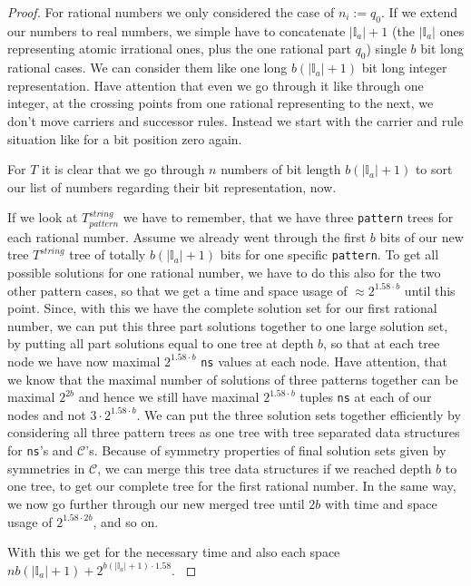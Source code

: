 \begin{proof}
    For rational numbers we only considered the case of $n_{i} := q_{0}$. If we extend our numbers to real numbers, we simple have to concatenate $|\mathbb{I}_{a}| + 1$ (the $|\mathbb{I}_{a}|$ ones representing atomic irrational ones, plus the one rational part $q_{0}$) single $b$ bit long rational cases. We can consider them like one long $b\left(|\mathbb{I}_{a}| + 1\right)$ bit long integer representation. Have attention that even we go through it like through one integer, at the crossing points from one rational representing to the next, we don't move carriers and successor rules. Instead we start with  the carrier and rule situation like for a bit position zero again.

For $T$ it is clear that we go through $n$ numbers of bit length $b\left(|\mathbb{I}_{a}| + 1\right)$ to sort our list of numbers regarding their bit representation, now.

If we look at $T^{string}_{pattern}$ we have to remember, that we have three \texttt{pattern} trees for each rational number. Assume we already went through the first $b$ bits of our new tree $T^{string}$ tree of totally $b\left(|\mathbb{I}_{a}| + 1\right)$ bits for one specific \texttt{pattern}. To get all possible solutions for one rational number, we have to do this also for the two other pattern cases, so that we get a time and space usage of $\approx 2^{1.58 \cdot b}$ until this point. Since, with this we have the complete solution set for our first rational number, we can put this three part solutions together to one large solution set, by putting all part solutions equal to one tree at depth $b$, so that at each tree node we have now maximal $ 2^{1.58 \cdot b}$ \texttt{ns} values at each node. Have attention, that we know that the maximal number of solutions of three patterns together can be maximal $2^{2b}$ and hence we still have maximal $2^{1.58 \cdot b}$ tuples \texttt{ns} at each of our nodes and not $3 \cdot 2^{1.58 \cdot b}$. We can put the three solution sets together efficiently by considering all three pattern trees as one tree with tree separated data structures for \texttt{ns}'s and $\mathcal{C}$'s. Because of symmetry properties of final solution sets given by symmetries in $\mathcal{C}$, we can merge this tree data structures if we reached depth $b$ to one tree, to get our complete tree for the first rational number. In the same way, we now go further through our new merged tree until $2b$ with time and space usage of $2^{1.58 \cdot 2b}$, and so on. 

With this we get for the necessary time and also each space $nb\left(|\mathbb{I}_{a}| + 1\right) + 2^{b\left(|\mathbb{I}_{a}| + 1\right) \cdot 1.58}$.
\label{proof:complexitiesof3sumrealnumbers}
\end{proof}
